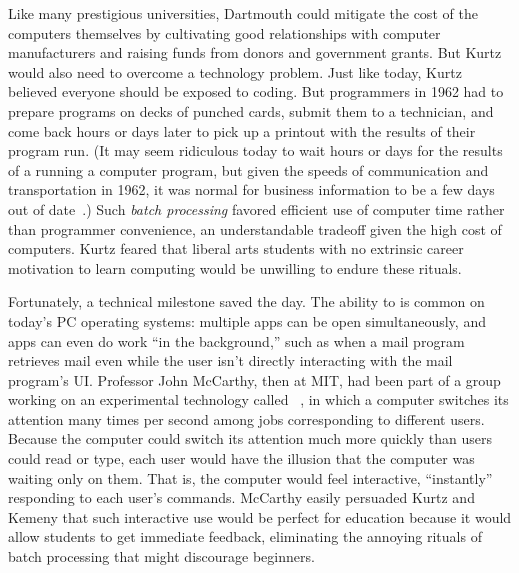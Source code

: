 Like many prestigious universities, Dartmouth could mitigate the cost of
the computers themselves by cultivating good relationships with
computer manufacturers and raising funds from donors and government
grants.
But Kurtz would also need to overcome a technology problem.
Just like today, Kurtz believed everyone should be exposed to coding.
But programmers in 1962 had to prepare programs on decks of punched cards,
submit them to a technician,
and come back hours or days later to pick up a printout with
the results of their program run.
(It may seem ridiculous today to wait hours or days for the results of a
running a computer program, but given the speeds of 
communication and transportation in 1962, it was normal for
business information to be a few days out of
date~\cite{ceruzzi}.) 
Such \emph{batch processing} favored efficient use of computer time rather
than programmer convenience, an understandable
tradeoff given the high cost of computers.
Kurtz feared that liberal arts students with no
extrinsic career motivation to learn computing would be unwilling
to endure these rituals.

Fortunately, a technical milestone saved the day.
The ability to  is common on today's
PC operating systems: multiple apps can be open
simultaneously, and apps can even do work ``in the background,''
such as when a mail program
retrieves mail even while the user isn't
directly interacting with the mail program's UI.
Professor John McCarthy, then at MIT, had been part of a group working
on an experimental technology called
~\cite{corbato62timesharing}, in which a computer
switches its attention many times per second among jobs corresponding to
different users.
Because the computer could switch its attention much more quickly than
users could read or type, each user would have the illusion that the computer
was waiting only on them.  That is, the computer would feel
interactive, ``instantly'' responding to each user's commands.
McCarthy easily persuaded Kurtz and Kemeny that such interactive
use would be perfect for education because it would allow
students to get
immediate feedback, eliminating the annoying rituals of batch
processing that might discourage beginners.


